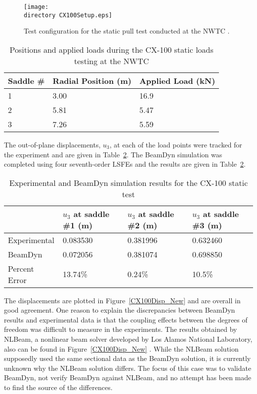\documentclass{aiaa-tc}
\def\directory{EPSF/}
\begin{document}
\begin{figure}
\centering
\texttt{[image: \\directory CX100Setup.eps]}
\caption{Test configuration for the static pull test conducted at the NWTC \cite{paquette2006modeling}.} 
\label{CX100Setup}
\end{figure}

\begin{table} 
\caption{\label{CX100Load}Positions and applied loads during the CX-100 static loads testing at the NWTC  } 
\begin{center}
    \begin{tabular}{| l | l |l |}
    	\hline
    	 Saddle \# &     Radial Position (m) & Applied Load (kN)  \\ \hline
    1&	3.00 & 16.9         \\  \hline
    2&	5.81   & 5.47         \\ \hline
    3&	    	7.26   & 5.59         \\ \hline
    \end{tabular}
\end{center}
\end{table}

The out-of-plane displacements, $u_3$, at each of the load points were tracked for the experiment and are given in Table~\ref{CX100Results}. The BeamDyn simulation was completed using four seventh-order LSFEs and the results are given in Table~\ref{CX100Results}.

\begin{table}
\caption{\label{CX100Results}Experimental and BeamDyn simulation results for the CX-100 static test  } 
\begin{center}
    \begin{tabular}{| l | l | l | l |}
    	\hline
    	             & $u_3$ at saddle \#1 (m) & $u_3$ at saddle \#2 (m) & $u_3$ at saddle \#3 (m) \\ \hline
    	Experimental & 0.083530             & 0.381996               & 0.632460             \\ \hline
    	BeamDyn      & 0.072056               & 0.381074                & 0.698850           \\ \hline
    	    	Percent Error      &        13.74\%        & 0.24\%                & 10.5\%           \\ \hline
    \end{tabular}
\end{center}
\end{table} 
The displacements are plotted in Figure~\ref{CX100Disp_New} and are overall in good agreement. One reason to explain the discrepancies between BeamDyn results and experimental data is that the coupling effects between the degrees of freedom was difficult to measure in the experiments. The results obtained by NLBeam, a nonlinear beam solver developed by Los Alamos National Laboratory, also can be found in Figure~\ref{CX100Disp_New} \cite{Luscher:2013}. While the NLBeam solution supposedly used the same sectional data as the BeamDyn solution, it is currently unknown why the NLBeam solution differs.  The focus of this case was to validate BeamDyn, not verify BeamDyn against NLBeam, and no attempt has been made to find the source of the differences.
\end{document}
